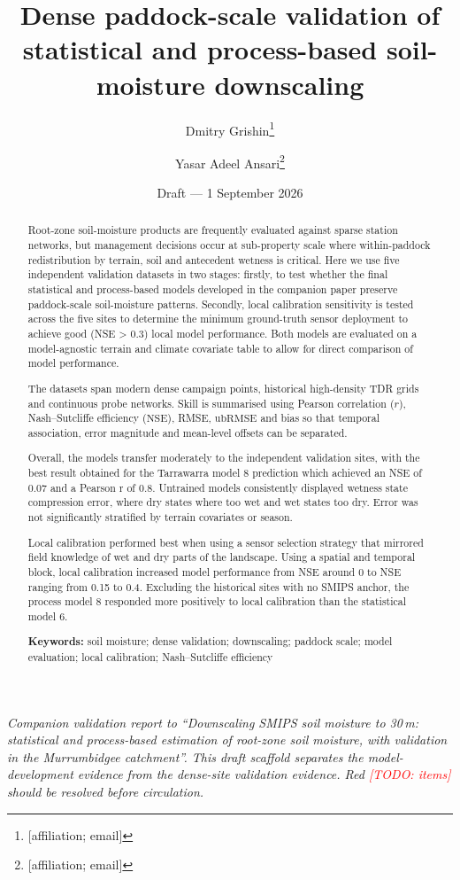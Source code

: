 \documentclass[11pt,a4paper]{article}
\title{Dense paddock-scale validation of statistical and process-based
soil-moisture downscaling}
\author{Dmitry Grishin\thanks{[affiliation; email]} \and
Yasar Adeel Ansari\thanks{[affiliation; email]}}
\date{Draft --- 1 September 2026}
\newcommand{\nse}{\ensuremath{\mathrm{NSE}}}
\newcommand{\ubrmse}{\ensuremath{\mathrm{ubRMSE}}}
\newcommand{\pearsonr}{\ensuremath{r}}
\newcommand{\todo}[1]{\textcolor{red}{[TODO: #1]}}
\begin{document}
\maketitle

\begin{center}
\begin{minipage}{0.9\textwidth}\small\itshape
Companion validation report to ``Downscaling SMIPS soil moisture to 30\,m:
statistical and process-based estimation of root-zone soil moisture, with
validation in the Murrumbidgee catchment''.  This draft scaffold separates the
model-development evidence from the dense-site validation evidence.  Red
\todo{items} should be resolved before circulation.
\end{minipage}
\end{center}

\begin{abstract}

Root-zone soil-moisture products are frequently evaluated against sparse
station networks, but management decisions occur at sub-property scale where
within-paddock redistribution by terrain, soil and antecedent wetness is
critical. Here we use five independent validation datasets in two stages: firstly, to test
whether the final statistical and process-based models developed in the
companion paper preserve paddock-scale soil-moisture patterns. Secondly, 
local calibration sensitivity is tested across the five sites to determine 
the minimum ground-truth sensor deployment to achieve good (NSE > 0.3) local model 
performance. Both models are evaluated on a model-agnostic terrain and climate covariate 
table to allow for direct comparison of model performance. 

The datasets span modern dense campaign points,
historical high-density TDR grids and continuous probe networks.  Skill is
summarised using Pearson correlation ($\pearsonr$),
Nash--Sutcliffe efficiency (\nse{}), RMSE, \ubrmse{} and bias so that temporal
association, error magnitude and mean-level offsets can be separated. 

Overall, the models transfer moderately to the independent validation sites, with
the best result obtained for the Tarrawarra model 8 prediction which achieved an NSE of 0.07 
and a Pearson r of 0.8. Untrained models consistently displayed wetness state compression
error, where dry states where too wet and wet states too dry. Error was not significantly 
stratified by terrain covariates or season. 

Local calibration performed best when using a sensor selection strategy that mirrored 
field knowledge of wet and dry parts of the landscape. Using a spatial and temporal block, 
local calibration increased model performance from NSE around 0 to NSE ranging from 0.15 to 0.4. 
Excluding the historical sites with no SMIPS anchor, the process model 8 responded more positively
to local calibration than the statistical model 6. 

\medskip
\noindent\textbf{Keywords:} soil moisture; dense validation; downscaling;
paddock scale; model evaluation; local calibration; Nash--Sutcliffe efficiency
\end{abstract}
\end{document}
